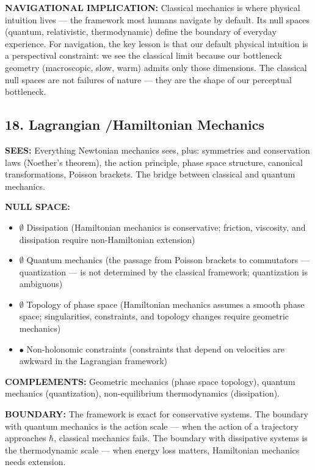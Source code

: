 \textbf{NAVIGATIONAL IMPLICATION:} Classical mechanics is where physical intuition lives — the framework most humans navigate by default. Its null spaces (quantum, relativistic, thermodynamic) define the boundary of everyday experience. For navigation, the key lesson is that our default physical intuition is a perspectival constraint: we see the classical limit because our bottleneck geometry (macroscopic, slow, warm) admits only those dimensions. The classical null spaces are not failures of nature — they are the shape of our perceptual bottleneck.


\bigskip\noindent\makebox[\textwidth]{\color{rulegray}\rule{5cm}{0.3pt}}\bigskip


\subsection*{18. Lagrangian /\allowbreak  Hamiltonian Mechanics}


\textbf{SEES:} Everything Newtonian mechanics sees, plus: symmetries and conservation laws (Noether's theorem), the action principle, phase space structure, canonical transformations, Poisson brackets. The bridge between classical and quantum mechanics.


\textbf{NULL SPACE:}

\begin{itemize}[nosep,leftmargin=*]
  \item $\emptyset$ Dissipation (Hamiltonian mechanics is conservative; friction, viscosity, and dissipation require non-Hamiltonian extension)
  \item $\emptyset$ Quantum mechanics (the passage from Poisson brackets to commutators — quantization — is not determined by the classical framework; quantization is ambiguous)
  \item $\emptyset$ Topology of phase space (Hamiltonian mechanics assumes a smooth phase space; singularities, constraints, and topology changes require geometric mechanics)
  \item $\bullet$ Non-holonomic constraints (constraints that depend on velocities are awkward in the Lagrangian framework)
\end{itemize}


\textbf{COMPLEMENTS:} Geometric mechanics (phase space topology), quantum mechanics (quantization), non-equilibrium thermodynamics (dissipation).


\textbf{BOUNDARY:} The framework is exact for conservative systems. The boundary with quantum mechanics is the action scale — when the action of a trajectory approaches $\hbar$, classical mechanics fails. The boundary with dissipative systems is the thermodynamic scale — when energy loss matters, Hamiltonian mechanics needs extension.


